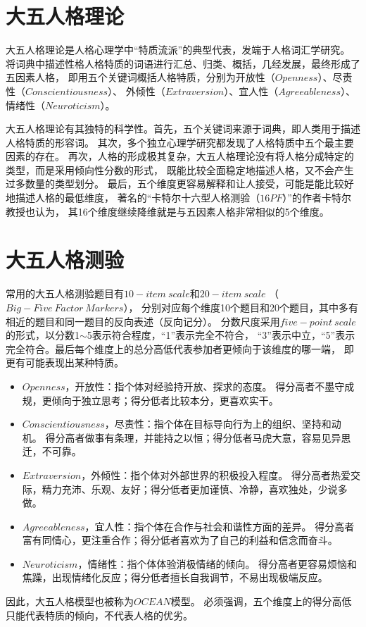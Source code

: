 \documentclass[UTF8]{ctexart}
\begin{document}
\section{大五人格理论}
大五人格理论是人格心理学中“特质流派”的典型代表，发端于人格词汇学研究。
将词典中描述性格人格特质的词语进行汇总、归类、概括，几经发展，最终形成了五因素人格，
即用五个关键词概括人格特质，分别为开放性（$Openness$）、尽责性（$Conscientiousness$）、
外倾性（$Extraversion$）、宜人性（$Agreeableness$）、情绪性（$Neuroticism$）。\par
大五人格理论有其独特的科学性。首先，五个关键词来源于词典，即人类用于描述人格特质的形容词。
其次，多个独立心理学研究都发现了人格特质中五个最主要因素的存在。
再次，人格的形成极其复杂，大五人格理论没有将人格分成特定的类型，而是采用倾向性分数的形式，
既能比较全面稳定地描述人格，又不会产生过多数量的类型划分。
最后，五个维度更容易解释和让人接受，可能是能比较好地描述人格的最低维度，
著名的“卡特尔十六型人格测验（$16PF$）”的作者卡特尔教授也认为，
其16个维度继续降维就是与五因素人格非常相似的5个维度。
\section{大五人格测验}
常用的大五人格测验题目有$10-item\ scale$和$20-item\ scale$
（\href{https://ipip.ori.org/newBigFive5broadKey.htm}{$Big-Five\ Factor\ Markers$}），
分别对应每个维度10个题目和20个题目，其中多有相近的题目和同一题目的反向表述（反向记分）。
分数尺度采用$five-point\ scale$的形式，以分数1$\sim$5表示符合程度，“1”表示完全不符合，
“3”表示中立，“5”表示完全符合。最后每个维度上的总分高低代表参加者更倾向于该维度的哪一端，
即更有可能表现出某种特质。
\begin{itemize}
  \item $Openness$，开放性：指个体对经验持开放、探求的态度。
        得分高者不墨守成规，更倾向于独立思考；得分低者比较本分，更喜欢实干。
  \item $Conscientiousness$，尽责性：指个体在目标导向行为上的组织、坚持和动机。
        得分高者做事有条理，并能持之以恒；得分低者马虎大意，容易见异思迁，不可靠。
  \item $Extraversion$，外倾性：指个体对外部世界的积极投入程度。
        得分高者热爱交际，精力充沛、乐观、友好；得分低者更加谨慎、冷静，喜欢独处，少说多做。
  \item $Agreeableness$，宜人性：指个体在合作与社会和谐性方面的差异。
        得分高者富有同情心，更注重合作；得分低者喜欢为了自己的利益和信念而奋斗。
  \item $Neuroticism$，情绪性：指个体体验消极情绪的倾向。
        得分高者更容易烦恼和焦躁，出现情绪化反应；得分低者擅长自我调节，不易出现极端反应。
\end{itemize}
\par
因此，大五人格模型也被称为$OCEAN$模型。
必须强调，五个维度上的得分高低只能代表特质的倾向，不代表人格的优劣。
\end{document}
